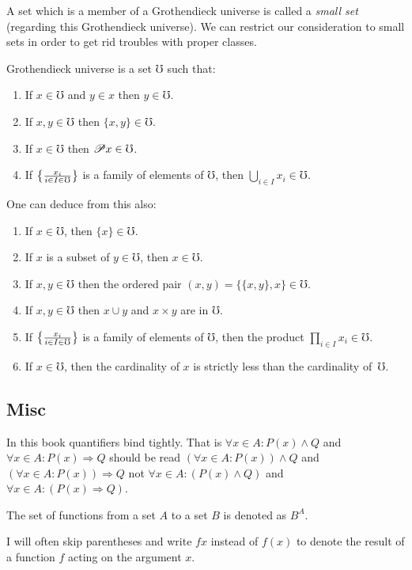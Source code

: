 A set which is a member of a Grothendieck universe
is called a \emph{small set} (regarding this Grothendieck universe).
We can restrict our consideration to small sets in order to get rid
troubles with proper classes.
\begin{defn}
Grothendieck universe is a set $\mho$ such that:
\begin{enumerate}
\item If $x\in\mho$ and $y\in x$ then $y\in\mho$.
\item If $x,y\in\mho$ then $\{x,y\}\in\mho$.
\item If $x\in\mho$ then $\mathscr{P} x\in\mho$.
\item If $\left\{ \frac{x_{i}}{i\in I\in\mho}\right\}$ is a family of elements of $\mho$,
then $\bigcup_{i\in I}x_{i}\in\mho$.
\end{enumerate}
\end{defn}
One can deduce from this also:
\begin{enumerate}
\item If $x\in\mho$, then $\{x\}\in\mho$.
\item If $x$ is a subset of $y\in\mho$, then $x\in\mho$.
\item If $x,y\in\mho$ then the ordered pair $(x,y)=\{\{x,y\},x\}\in\mho$.
\item If $x,y\in\mho$ then $x\cup y$ and $x\times y$ are in $\mho$.
\item If $\left\{ \frac{x_{i}}{i\in I\in\mho}\right\}$ is a family of elements of $\mho$,
then the product $\prod_{i\in I}x_{i}\in\mho$.
\item If $x\in\mho$, then the cardinality of $x$ is strictly less than
the cardinality of~$\mho$.
\end{enumerate}

\subsection{Misc}

In this book quantifiers bind tightly. That is $\forall x\in A:P(x)\land Q$
and $\forall x\in A:P(x)\Rightarrow Q$ should be read $\left(\forall x\in A:P(x)\right)\land Q$
and $\left(\forall x\in A:P(x)\right)\Rightarrow Q$ not $\forall x\in A:\left(P(x)\land Q\right)$
and $\forall x\in A:\left(P(x)\Rightarrow Q\right)$.

The set of functions from a set $A$ to a set $B$ is denoted as $B^{A}$.

I will often skip parentheses and write $fx$ instead of $f(x)$ to
denote the result of a function $f$ acting on the argument $x$.

